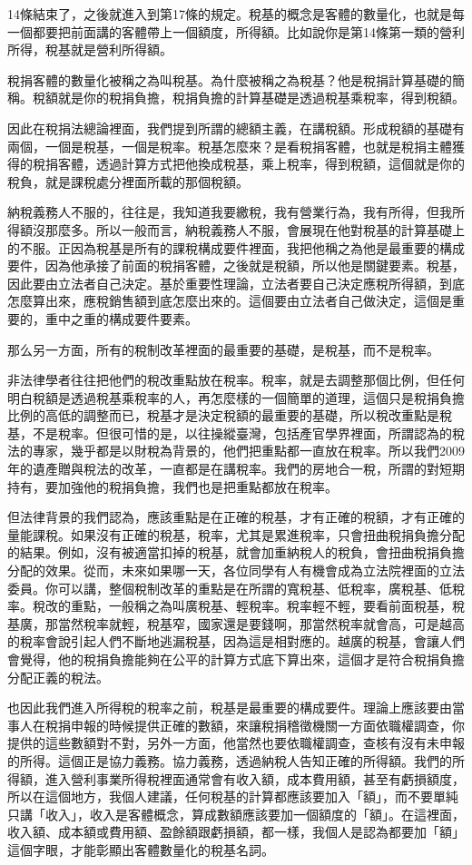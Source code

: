 \documentclass[oneside,sub3section]{ctexbook}
\begin{document}
14條結束了，之後就進入到第17條的規定。稅基的概念是客體的數量化，也就是每一個都要把前面講的客體帶上一個額度，所得額。比如說你是第14條第一類的營利所得，稅基就是營利所得額。

稅捐客體的數量化被稱之為叫稅基。為什麼被稱之為稅基？他是稅捐計算基礎的簡稱。稅額就是你的稅捐負擔，稅捐負擔的計算基礎是透過稅基乘稅率，得到稅額。

因此在稅捐法總論裡面，我們提到所謂的總額主義，在講稅額。形成稅額的基礎有兩個，一個是稅基，一個是稅率。稅基怎麼來？是看稅捐客體，也就是稅捐主體獲得的稅捐客體，透過計算方式把他換成稅基，乘上稅率，得到稅額，這個就是你的稅負，就是課稅處分裡面所載的那個稅額。

納稅義務人不服的，往往是，我知道我要繳稅，我有營業行為，我有所得，但我所得額沒那麼多。所以一般而言，納稅義務人不服，會展現在他對稅基的計算基礎上的不服。正因為稅基是所有的課稅構成要件裡面，我把他稱之為他是最重要的構成要件，因為他承接了前面的稅捐客體，之後就是稅額，所以他是關鍵要素。稅基，因此要由立法者自己決定。基於重要性理論，立法者要自己決定應稅所得額，到底怎麼算出來，應稅銷售額到底怎麼出來的。這個要由立法者自己做決定，這個是重要的，重中之重的構成要件要素。

那么另一方面，所有的稅制改革裡面的最重要的基礎，是稅基，而不是稅率。

非法律學者往往把他們的稅改重點放在稅率。稅率，就是去調整那個比例，但任何明白稅額是透過稅基乘稅率的人，再怎麼樣的一個簡單的道理，這個只是稅捐負擔比例的高低的調整而已，稅基才是決定稅額的最重要的基礎，所以稅改重點是稅基，不是稅率。但很可惜的是，以往操縱臺灣，包括產官學界裡面，所謂認為的稅法的專家，幾乎都是以財稅為背景的，他們把重點都一直放在稅率。所以我們2009年的遺產贈與稅法的改革，一直都是在講稅率。我們的房地合一稅，所謂的對短期持有，要加強他的稅捐負擔，我們也是把重點都放在稅率。

但法律背景的我們認為，應該重點是在正確的稅基，才有正確的稅額，才有正確的量能課稅。如果沒有正確的稅基，稅率，尤其是累進稅率，只會扭曲稅捐負擔分配的結果。例如，沒有被適當扣掉的稅基，就會加重納稅人的稅負，會扭曲稅捐負擔分配的效果。從而，未來如果哪一天，各位同學有人有機會成為立法院裡面的立法委員。你可以講，整個稅制改革的重點是在所謂的寬稅基、低稅率，廣稅基、低稅率。稅改的重點，一般稱之為叫廣稅基、輕稅率。稅率輕不輕，要看前面稅基，稅基廣，那當然稅率就輕，稅基窄，國家還是要錢啊，那當然稅率就會高，可是越高的稅率會說引起人們不斷地逃漏稅基，因為這是相對應的。越廣的稅基，會讓人們會覺得，他的稅捐負擔能夠在公平的計算方式底下算出來，這個才是符合稅捐負擔分配正義的稅法。

也因此我們進入所得稅的稅率之前，稅基是最重要的構成要件。理論上應該要由當事人在稅捐申報的時候提供正確的數額，來讓稅捐稽徵機關一方面依職權調查，你提供的這些數額對不對，另外一方面，他當然也要依職權調查，查核有沒有未申報的所得。這個正是協力義務。協力義務，透過納稅人告知正確的所得額。我們的所得額，進入營利事業所得稅裡面通常會有收入額，成本費用額，甚至有虧損額度，所以在這個地方，我個人建議，任何稅基的計算都應該要加入「額」，而不要單純只講「收入」，收入是客體概念，算成數額應該要加一個額度的「額」。在這裡面，收入額、成本額或費用額、盈餘額跟虧損額，都一樣，我個人是認為都要加「額」這個字眼，才能彰顯出客體數量化的稅基名詞。
\end{document}
